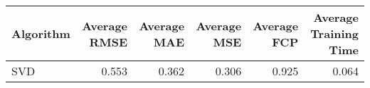 \begin{tabular}{lrrrrr}
\toprule
Algorithm & Average RMSE & Average MAE & Average MSE & Average FCP & Average Training Time \\
\midrule
SVD & 0.553 & 0.362 & 0.306 & 0.925 & 0.064 \\
\bottomrule
\end{tabular}
